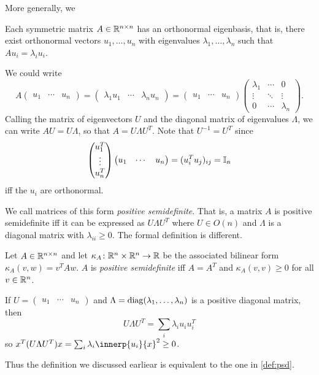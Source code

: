 More generally, we 
\begin{theorem} \label{thm:spectral}
    Each symmetric matrix $A \in \mathbb{R}^{n \times n}$ has an orthonormal
    eigenbasis, that is, there exist orthonormal vectors $u_1, \dots, u_n$
    with eigenvalues $\lambda_1, \dots, \lambda_n$ such that
    $A u_i = \lambda_i u_i$.
\end{theorem}
We could write \[
    A \begin{pmatrix}
        u_1 & \cdots & u_n
    \end{pmatrix} = \begin{pmatrix}
        \lambda_1 u_1 & \cdots & \lambda_n u_n
    \end{pmatrix} = \begin{pmatrix}
        u_1 & \cdots & u_n
    \end{pmatrix} \begin{pmatrix}
        \lambda_1 & \cdots & 0 \\
        \vdots & \ddots & \vdots \\
        0 & \cdots & \lambda_n
    \end{pmatrix}.
\] Calling the matrix of eigenvectors $U$ and the diagonal matrix of
eigenvalues $\Lambda$, we can write $A U = U \Lambda$, so that
$A = U \Lambda U^T$.
Note that $U^{-1} = U^T$ since \[
    \begin{pmatrix}
        u_1^T \\
        \vdots \\
        u_n^T
    \end{pmatrix} \begin{pmatrix}
        u_1 & \cdots & u_n
    \end{pmatrix} = (u_i^T u_j)_{ij} = \mathbb{I}_n
\] iff the $u_i$ are orthonormal.

We call matrices of this form \emph{positive semidefinite}.
That is, a matrix $A$ is positive semidefinite iff it can be expressed as
$U \Lambda U^T$ where $U \in O(n)$ and $\Lambda$ is a diagonal matrix with
$\lambda_{i i} \ge 0$.
The formal definition is different.
\begin{definition} \label{def:psd}
    Let $A \in \mathbb{R}^{n \times n}$ and let
    $\kappa_A\colon \mathbb{R}^n \times \mathbb{R}^n \to \mathbb{R}$ be the associated bilinear form
    $\kappa_A(v, w) = v^T A w$.
    $A$ is \emph{positive semidefinite} iff $A = A^T$ and
    $\kappa_A(v, v) \ge 0$ for all $v \in \mathbb{R}^n$.
\end{definition}

\begin{remark}
    If $U = \begin{pmatrix}
        u_1 & \cdots & u_n
    \end{pmatrix}$ and $\Lambda = \operatorname{diag}(\lambda_1, \dots, \lambda_n)$
    is a positive diagonal matrix, then \[
        U \Lambda U^T = \sum_i \lambda_i u_i u_i^T
    \] so $x^T (U \Lambda U^T) x = \sum_i \lambda_i \innerp{u_i}{x}^2 \ge 0$.

    Thus the definition we discussed earliear is equivalent to the one in
    \cref{def:psd}.
\end{remark}

